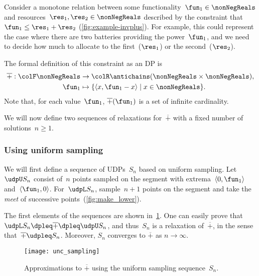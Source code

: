 Consider a monotone relation between some functionality~$\fun_{1}\in\nonNegReals$
and resources~$\res_{1},\res_{2}\in\nonNegReals$ described by
the constraint that~$\fun_{1}\leq\res_{1}+\res_{2}$ (\cref{fig:example-invplus}).
For example, this could represent the case where there are two batteries
providing the power~$\fun_{1}$, and we need to decide how much to
allocate to the first~($\res_{1}$) or the second~($\res_{2}$).


The formal definition of this constraint as an DP is
\begin{align*}
    \overline{+}:{\colF\nonNegReals} & \rightarrow{\colR\antichains(\nonNegReals\times\nonNegReals)},           \\
    \fun_{1}                         & \mapsto\{\left\langle x,\fun_{1}-x\right\rangle \mid x\in\nonNegReals\}.
\end{align*}
Note that, for each value~$\fun_{1}$, $\overline{+}(\fun_{1})$
is a set of infinite cardinality.

We will now define two sequences of relaxations for~$\overline{+}$
with a fixed number of solutions~$n\geq1$.

\subsubsection*{Using uniform sampling}

We will first define a sequence of UDPs~$S_{n}$ based on uniform
sampling.
Let~$\udpU S_{n}$ consist of~$n$ points sampled on the
segment with extrema~$\left\langle 0,\fun_{1}\right\rangle $ and~$\left\langle \fun_{1},0\right\rangle $.
For~$\udpL S_{n}$, sample~$n+1$ points on the segment and take
the \emph{meet} of successive points~(\cref{fig:make_lower}).
\begin{center}
    \par
\end{center}

The first elements of the sequences are shown in~\cref{fig:approx_invplus}.
One can easily prove that $\udpL S_{n}\dpleq\overline{+}\dpleq\udpU S_{n}$,
and thus~$S_{n}$ is a relaxation of~$\overline{+}$, in the sense
that~$\overline{+}\udpleq S_{n}$.
Moreover, $S_{n}$ converges to
$\overline{+}$ as $n\rightarrow\infty$.

\begin{figure}[h]
    \centering
    \texttt{[image: unc\_sampling]}
    \caption{Approximations to $\overline{+}$ using
        the uniform sampling sequence~$S_{n}$. }
    \label{fig:approx_invplus}
\end{figure}


